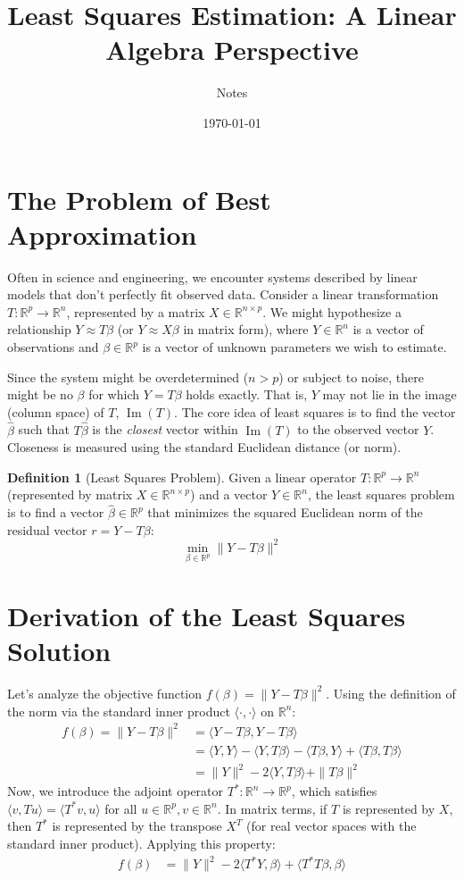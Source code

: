 \documentclass[11pt]{article}
\title{Least Squares Estimation: A Linear Algebra Perspective}
\author{Notes} %
\date{\today}
\theoremstyle{definition}
\newtheorem{definition}[theorem]{Definition}
\theoremstyle{remark}
\newcommand{\R}{\mathbb{R}} %
\newcommand{\norm}[1]{\|#1\|} %
\newcommand{\inner}[2]{\langle #1, #2 \rangle} %
\DeclareMathOperator{\im}{Im} %
\begin{document}
\maketitle

\section{The Problem of Best Approximation}

Often in science and engineering, we encounter systems described by linear models that don't perfectly fit observed data. Consider a linear transformation $T: \R^p \to \R^n$, represented by a matrix $X \in \R^{n \times p}$. We might hypothesize a relationship $Y \approx T\beta$ (or $Y \approx X\beta$ in matrix form), where $Y \in \R^n$ is a vector of observations and $\beta \in \R^p$ is a vector of unknown parameters we wish to estimate.

Since the system might be overdetermined ($n > p$) or subject to noise, there might be no $\beta$ for which $Y = T\beta$ holds exactly. That is, $Y$ may not lie in the image (column space) of $T$, $\im(T)$. The core idea of least squares is to find the vector $\hat{\beta}$ such that $T\hat{\beta}$ is the \emph{closest} vector within $\im(T)$ to the observed vector $Y$. Closeness is measured using the standard Euclidean distance (or norm).

\begin{definition}[Least Squares Problem]
Given a linear operator $T: \R^p \to \R^n$ (represented by matrix $X \in \R^{n \times p}$) and a vector $Y \in \R^n$, the least squares problem is to find a vector $\hat{\beta} \in \R^p$ that minimizes the squared Euclidean norm of the residual vector $r = Y - T\beta$:
\[
\min_{\beta \in \R^p} \norm{Y - T\beta}^2
\]
\end{definition}

\section{Derivation of the Least Squares Solution}

Let's analyze the objective function $f(\beta) = \norm{Y - T\beta}^2$. Using the definition of the norm via the standard inner product $\inner{\cdot}{\cdot}$ on $\R^n$:
\begin{align*}
f(\beta) = \norm{Y - T\beta}^2 &= \inner{Y - T\beta}{Y - T\beta} \\
&= \inner{Y}{Y} - \inner{Y}{T\beta} - \inner{T\beta}{Y} + \inner{T\beta}{T\beta} \\
&= \norm{Y}^2 - 2 \inner{Y}{T\beta} + \norm{T\beta}^2
\end{align*}
Now, we introduce the adjoint operator $T^*: \R^n \to \R^p$, which satisfies $\inner{v}{Tu} = \inner{T^* v}{u}$ for all $u \in \R^p, v \in \R^n$. In matrix terms, if $T$ is represented by $X$, then $T^*$ is represented by the transpose $X^T$ (for real vector spaces with the standard inner product). Applying this property:
\begin{align*}
f(\beta) &= \norm{Y}^2 - 2 \inner{T^* Y}{\beta} + \inner{T^* T \beta}{\beta}
\end{align*}
\end{document}
